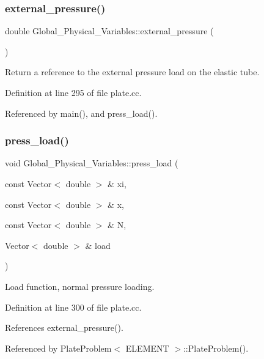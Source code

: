 \subsubsection{\texorpdfstring{external\+\_\+pressure()}{external\_pressure()}}
{\footnotesize\ttfamily double Global\+\_\+\+Physical\+\_\+\+Variables\+::external\+\_\+pressure (\begin{DoxyParamCaption}{ }\end{DoxyParamCaption})}



Return a reference to the external pressure load on the elastic tube. 



Definition at line 295 of file plate.\+cc.



Referenced by main(), and press\+\_\+load().

\mbox{\label{namespaceGlobal__Physical__Variables_a86fd8f502cb8c4c7939ffae742f023eb}} 
\subsubsection{\texorpdfstring{press\+\_\+load()}{press\_load()}}
{\footnotesize\ttfamily void Global\+\_\+\+Physical\+\_\+\+Variables\+::press\+\_\+load (\begin{DoxyParamCaption}\item[{const Vector$<$ double $>$ \&}]{xi,  }\item[{const Vector$<$ double $>$ \&}]{x,  }\item[{const Vector$<$ double $>$ \&}]{N,  }\item[{Vector$<$ double $>$ \&}]{load }\end{DoxyParamCaption})}



Load function, normal pressure loading. 



Definition at line 300 of file plate.\+cc.



References external\+\_\+pressure().



Referenced by Plate\+Problem$<$ E\+L\+E\+M\+E\+N\+T $>$\+::\+Plate\+Problem().



